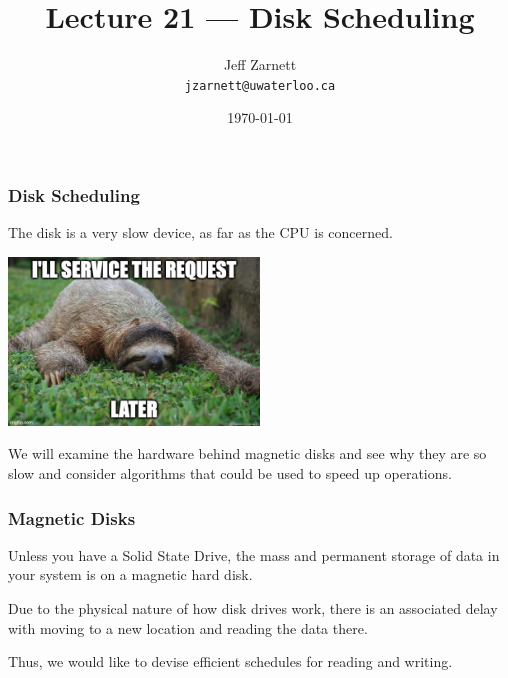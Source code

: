 

\title{Lecture 21 --- Disk Scheduling }

\author{Jeff Zarnett \\ \small \texttt{jzarnett@uwaterloo.ca}}
\date{\today}




\begin{frame}
  \titlepage

 \end{frame}



\begin{frame}
\frametitle{Disk Scheduling}

The disk is a very slow device, as far as the CPU is concerned.

\begin{center}
	\includegraphics[width=0.5\textwidth]{images/sloth.jpg}
\end{center}

We will examine the hardware behind magnetic disks and see why they are so slow and consider algorithms that could be used to speed up operations.

 \end{frame}

\begin{frame}
\frametitle{Magnetic Disks}

Unless you have a Solid State Drive, the mass and permanent storage of data in your system is on a magnetic hard disk. 

Due to the physical nature of how disk drives work, there is an associated delay with moving to a new location and reading the data there. 

Thus, we would like to devise efficient schedules for reading and writing.


\end{frame}

